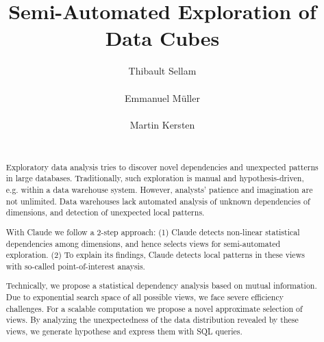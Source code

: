 \documentclass{acm_proc_article-sp}
\begin{document}
\title{Semi-Automated Exploration of Data Cubes}


\author{
\alignauthor
Thibault Sellam\\
       \\
\alignauthor
Emmanuel M\"uller\\
       \\
\alignauthor
Martin Kersten\\
       \\
}

\maketitle

\begin{abstract}
Exploratory data analysis tries to discover novel dependencies and unexpected
patterns in large databases. Traditionally, such exploration is manual and
hypothesis-driven, e.g. within a data warehouse system. However, analysts'
patience and imagination are not unlimited. Data warehouses lack automated
analysis of unknown dependencies of dimensions, and detection of unexpected
local patterns.
 
With Claude we follow a 2-step approach: (1) Claude detects non-linear
statistical dependencies among dimensions, and hence selects views for
semi-automated exploration. (2) To explain its findings, Claude detects local
patterns in these views with so-called point-of-interest anaysis.

Technically, we propose a statistical dependency analysis based on mutual
information. Due to exponential search space of all possible views, we face
severe efficiency challenges. For a scalable computation we propose a novel
approximate selection of views. By analyzing the unexpectedness of the data
distribution revealed by these views, we generate hypothese and express them
with SQL queries.
\end{abstract}






\balancecolumns
\end{document}
